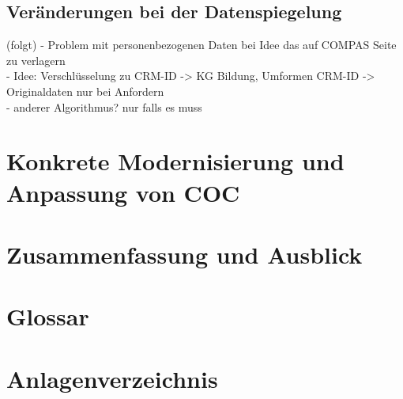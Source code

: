 \documentclass [12pt, a4paper, oneside, titlepage, ngerman]{article}
\begin{document}
\subsection{Veränderungen bei der Datenspiegelung}
(folgt)
- Problem mit personenbezogenen Daten bei Idee das auf COMPAS Seite zu verlagern\\
- Idee: Verschlüsselung zu CRM-ID -> KG Bildung, Umformen CRM-ID -> Originaldaten nur bei Anfordern\\
- anderer Algorithmus? nur falls es muss


\newpage

\section {Konkrete Modernisierung und Anpassung von COC}
\newpage

\section {Zusammenfassung und Ausblick}
\newpage






\newpage

\setcounter{page}{4}
\section* {Glossar}
\newpage

\section* {Anlagenverzeichnis}
\newpage
\end{document}
